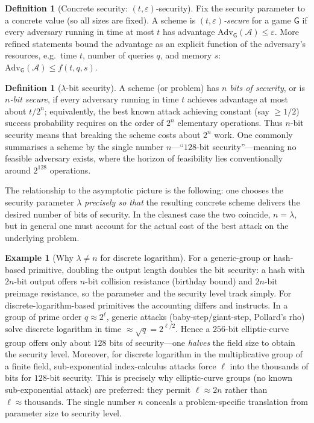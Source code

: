 \documentclass[11pt,a4paper]{article}
\theoremstyle{definition}
\newtheorem{definition}[theorem]{Definition}
\newtheorem{example}[theorem]{Example}
\theoremstyle{remark}
\begin{document}
\begin{definition}[Concrete security: \((t,\varepsilon)\)-security]\label{model:def:concrete}
Fix the security parameter to a concrete value (so all sizes are fixed). A scheme
is \emph{\((t,\varepsilon)\)-secure} for a game \(\mathsf{G}\) if every adversary
running in time at most \(t\) has advantage
\(\mathrm{Adv}_{\mathsf{G}}(\mathcal{A}) \leq \varepsilon\). More refined
statements bound the advantage as an explicit function of the adversary's
resources, e.g.\ time \(t\), number of queries \(q\), and memory \(s\):
\(\mathrm{Adv}_{\mathsf{G}}(\mathcal{A}) \leq f(t,q,s)\).
\end{definition}

\begin{definition}[\(\lambda\)-bit security]\label{model:def:bitsec}
A scheme (or problem) has \(n\) \emph{bits of security}, or is
\emph{\(n\)-bit secure}, if every adversary running in time \(t\) achieves
advantage at most about \(t / 2^{n}\); equivalently, the best known attack
achieving constant (say \(\geq 1/2\)) success probability requires on the order
of \(2^{n}\) elementary operations. Thus \(n\)-bit security means that breaking the
scheme costs about \(2^n\) work. One commonly summarises a scheme by the single number
\(n\)---``\(128\)-bit security''---meaning no feasible adversary exists, where the
horizon of feasibility lies conventionally around \(2^{128}\) operations.
\end{definition}

The relationship to the asymptotic picture is the following: one chooses the security
parameter \(\lambda\) \emph{precisely so that} the resulting concrete
scheme delivers the desired number of bits of security. In the cleanest case the
two coincide, \(n = \lambda\), but in general one must account for the actual cost
of the best attack on the underlying problem.

\begin{example}[Why \(\lambda \neq n\) for discrete logarithm]\label{model:exp:bitsec-dlog}
For a generic-group or hash-based primitive, doubling the output length doubles
the bit security: a hash with \(2n\)-bit output offers \(n\)-bit
collision resistance (birthday bound) and \(2n\)-bit preimage resistance, so the
parameter and the security level track simply. For discrete-logarithm-based
primitives the accounting differs and instructs. In a group of prime order
\(q \approx 2^{\ell}\), generic attacks (baby-step/giant-step, Pollard's rho)
solve discrete logarithm in time \(\approx \sqrt{q} = 2^{\ell/2}\). Hence a
\(256\)-bit elliptic-curve group offers only about \(128\) bits of security---one
\emph{halves} the field size to obtain the security level. Moreover, for
discrete logarithm in the multiplicative group of a finite field, sub-exponential
index-calculus attacks force \(\ell\) into the thousands of bits for \(128\)-bit
security. This is precisely why elliptic-curve groups (no known sub-exponential
attack) are preferred: they permit \(\ell \approx 2n\) rather than
\(\ell \approx \text{thousands}\). The single number \(n\) conceals a problem-specific
translation from parameter size to security level.
\end{example}
\end{document}
